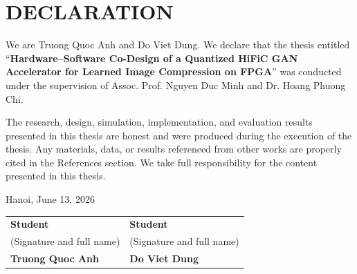 \section*{DECLARATION}
\thispagestyle{empty}

We are Truong Quoc Anh and Do Viet Dung. We declare that the thesis entitled ``\textbf{Hardware--Software Co-Design of a Quantized HiFiC GAN Accelerator for Learned Image Compression on FPGA}'' was conducted under the supervision of Assoc. Prof. Nguyen Duc Minh and Dr. Hoang Phuong Chi.

The research, design, simulation, implementation, and evaluation results presented in this thesis are honest and were produced during the execution of the thesis. Any materials, data, or results referenced from other works are properly cited in the References section. We take full responsibility for the content presented in this thesis.

\vspace{1.2cm}
\begin{flushright}
    Hanoi, June 13, 2026
\end{flushright}

\vspace{0.5cm}
\begin{center}
    \begin{tabular}{>{\centering\arraybackslash}p{} >{\centering\arraybackslash}p{}}
        \textbf{Student} & \textbf{Student} \\
        (Signature and full name) & (Signature and full name) \\
        [2.0cm]
        \textbf{Truong Quoc Anh} & \textbf{Do Viet Dung}
    \end{tabular}
\end{center}

\cleardoublepage